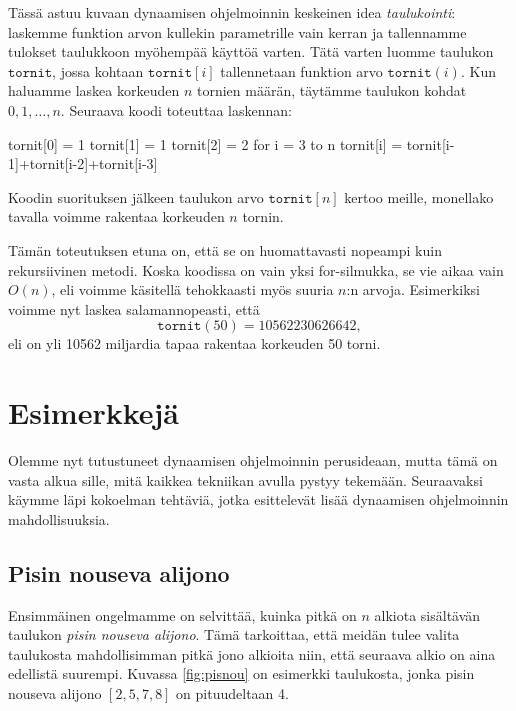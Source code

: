 
Tässä astuu kuvaan dynaamisen ohjelmoinnin keskeinen idea
\emph{taulukointi}:
laskemme funktion arvon kullekin parametrille vain kerran
ja tallennamme tulokset taulukkoon myöhempää käyttöä varten.
Tätä varten luomme taulukon $\texttt{tornit}$,
jossa kohtaan $\texttt{tornit}[i]$ tallennetaan funktion
arvo $\texttt{tornit}(i)$.
Kun haluamme laskea korkeuden $n$ tornien määrän,
täytämme taulukon kohdat $0,1,\dots,n$.
Seuraava koodi toteuttaa laskennan:

\begin{code}
tornit[0] = 1
tornit[1] = 1
tornit[2] = 2
for i = 3 to n
    tornit[i] = tornit[i-1]+tornit[i-2]+tornit[i-3]
\end{code}

Koodin suorituksen jälkeen taulukon arvo $\texttt{tornit}[n]$
kertoo meille, monellako tavalla voimme rakentaa
korkeuden $n$ tornin.

Tämän toteutuksen etuna on, että se on huomattavasti
nopeampi kuin rekursiivinen metodi.
Koska koodissa on vain yksi for-silmukka, se vie aikaa
vain $O(n)$, eli voimme käsitellä tehokkaasti myös
suuria $n$:n arvoja.
Esimerkiksi voimme nyt laskea salamannopeasti, että
\[
\texttt{tornit}(50) = 10562230626642,
\]
eli on yli 10562 miljardia tapaa rakentaa korkeuden 50 torni.

\section{Esimerkkejä}

Olemme nyt tutustuneet dynaamisen ohjelmoinnin perusideaan,
mutta tämä on vasta alkua sille, mitä kaikkea tekniikan
avulla pystyy tekemään.
Seuraavaksi käymme läpi kokoelman tehtäviä,
jotka esittelevät lisää dynaamisen ohjelmoinnin mahdollisuuksia.

\subsection{Pisin nouseva alijono}


Ensimmäinen ongelmamme on selvittää, kuinka pitkä on
$n$ alkiota sisältävän taulukon \emph{pisin nouseva alijono}.
Tämä tarkoittaa, että meidän tulee valita taulukosta
mahdollisimman pitkä jono alkioita niin,
että seuraava alkio on aina edellistä suurempi.
Kuvassa \ref{fig:pisnou} on esimerkki taulukosta,
jonka pisin nouseva alijono $[2,5,7,8]$ on pituudeltaan 4.


